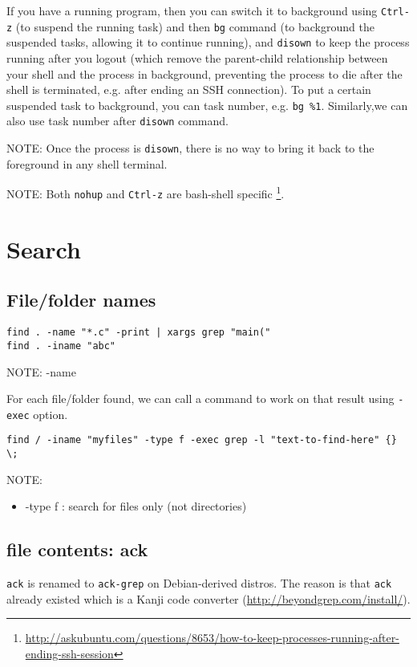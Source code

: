 If you have a running program, then you can switch it to background using
\verb!Ctrl-z! (to suspend the running task) and then \verb!bg! command (to
background the suspended tasks, allowing it to continue running), and
\verb!disown! to keep the process running after you logout (which remove the
parent-child relationship between your shell and the process in background,
preventing the process to die after the shell is terminated, e.g. after ending
an SSH connection). To put a certain suspended task to background, you can task
number, e.g. \verb!bg %1!. Similarly,we can also use task number after
\verb!disown! command. 

NOTE: Once the process is \verb!disown!, there is no way to bring it back to the
foreground in any shell terminal.

NOTE: Both \verb!nohup! and \verb!Ctrl-z! are bash-shell specific
\footnote{\url{http://askubuntu.com/questions/8653/how-to-keep-processes-running-after-ending-ssh-session}}.




\section{Search}

\subsection{File/folder names}

\begin{verbatim}
find . -name "*.c" -print | xargs grep "main("
find . -iname "abc" 
\end{verbatim}
NOTE: -name

For each file/folder found, we can call a command to work on that result using
\verb!-exec! option. 
\begin{verbatim}
find / -iname "myfiles" -type f -exec grep -l "text-to-find-here" {} \; 
\end{verbatim}

NOTE:
\begin{itemize}
  \item -type f : search for files only (not directories)
\end{itemize}

\subsection{file contents: ack}
\label{sec:ack}

\verb!ack! is renamed to \verb!ack-grep! on Debian-derived distros. The reason
is that \verb!ack! already existed which is a Kanji code converter
(\url{http://beyondgrep.com/install/}). 

